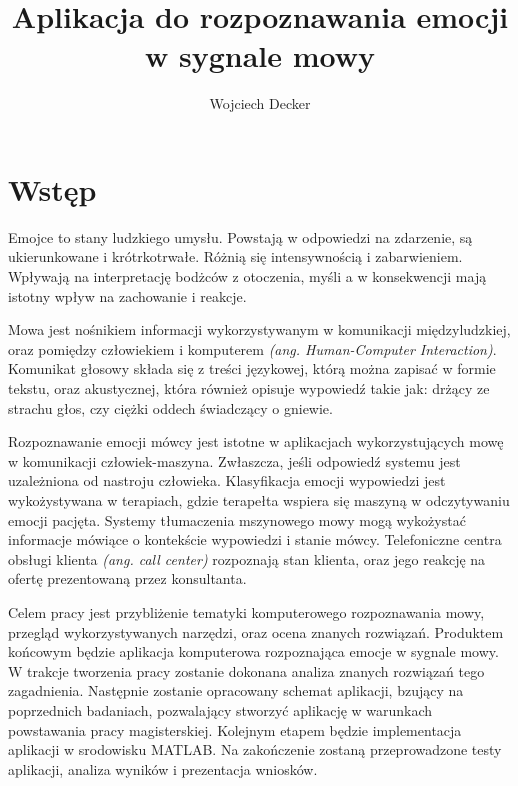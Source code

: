 \documentclass[a4paper,12pt,twoside,openany]{report}
\title{Aplikacja do rozpoznawania emocji w sygnale mowy}
\author{Wojciech Decker}
\newcommand{\ang}[1]{\textit{(ang. #1)}}
\begin{document}
    \maketitle
    \chapter{Wstęp}
    \label{ch:wstep}
    Emojce to stany ludzkiego umysłu.
    Powstają w odpowiedzi na zdarzenie, są ukierunkowane i krótrkotrwałe.
    Różnią się intensywnością i zabarwieniem.
    Wpływają na interpretację bodżców z otoczenia,
    myśli a w konsekwencji mają istotny wpływ na zachowanie i reakcje.

    Mowa jest nośnikiem informacji wykorzystywanym w komunikacji międzyludzkiej,
    oraz pomiędzy człowiekiem i komputerem \ang{Human-Computer Interaction}.
    Komunikat głosowy składa się z treści językowej,
    którą można zapisać w formie tekstu,
    oraz akustycznej, która również opisuje wypowiedź takie jak:
    drżący ze strachu głos, czy ciężki oddech świadczący o gniewie.

    Rozpoznawanie emocji mówcy jest istotne w aplikacjach wykorzystujących mowę w komunikacji człowiek-maszyna.
    Zwłaszcza, jeśli odpowiedź systemu jest uzależniona od nastroju człowieka.
    Klasyfikacja emocji wypowiedzi jest wykożystywana w terapiach,
    gdzie terapełta wspiera się maszyną w odczytywaniu emocji pacjęta.
    Systemy tłumaczenia mszynowego mowy mogą wykożystać informacje mówiące o kontekście wypowiedzi i stanie mówcy.
    Telefoniczne centra obsługi klienta \ang{call center} rozpoznają stan klienta,
    oraz jego reakcję na ofertę prezentowaną przez konsultanta.

    Celem pracy jest przybliżenie tematyki komputerowego rozpoznawania mowy,
    przegląd wykorzystywanych narzędzi, oraz ocena znanych rozwiązań.
    Produktem końcowym będzie aplikacja komputerowa rozpoznająca emocje w sygnale mowy.
    W trakcje tworzenia pracy zostanie dokonana analiza znanych rozwiązań tego zagadnienia.
    Następnie zostanie opracowany schemat aplikacji, bzujący na poprzednich badaniach,
    pozwalający stworzyć aplikację w warunkach powstawania pracy magisterskiej.
    Kolejnym etapem będzie implementacja aplikacji w srodowisku MATLAB.
    Na zakończenie zostaną przeprowadzone testy aplikacji,
    analiza wyników i prezentacja wniosków.
\end{document}

